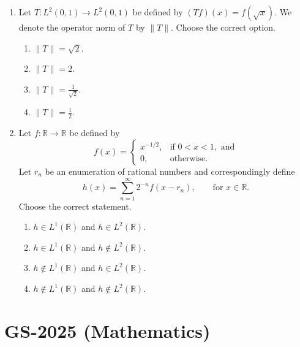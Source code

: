 \documentclass[11pt, a4paper]{article}
\begin{document}
\begin{enumerate}
  \item Let $T: L^2(0,1) \to L^2(0,1)$ be defined by $(Tf)(x) = f(\sqrt{x})$. We denote the operator norm of $T$ by $\|T\|$. Choose the correct option.
  \begin{enumerate}[label=(\alph*)]
    \item $\|T\| = \sqrt{2}$.
    \item $\|T\| = 2$.
    \item $\|T\| = \frac{1}{\sqrt{2}}$.
    \item $\|T\| = \frac{1}{2}$.
  \end{enumerate}

  \item Let $f: \mathbb{R} \to \mathbb{R}$ be defined by
  \[
    f(x) = \begin{cases}
      x^{-1/2}, & \text{if } 0 < x < 1, \text{ and} \\
      0, & \text{otherwise.}
    \end{cases}
  \]
  Let $r_n$ be an enumeration of rational numbers and correspondingly define
  \[
    h(x) = \sum_{n=1}^\infty 2^{-n} f(x - r_n), \qquad \text{for } x \in \mathbb{R}.
  \]
  Choose the correct statement.
  \begin{enumerate}[label=(\alph*)]
    \item $h \in L^1(\mathbb{R})$ and $h \in L^2(\mathbb{R})$.
    \item $h \in L^1(\mathbb{R})$ and $h \notin L^2(\mathbb{R})$.
    \item $h \notin L^1(\mathbb{R})$ and $h \in L^2(\mathbb{R})$.
    \item $h \notin L^1(\mathbb{R})$ and $h \notin L^2(\mathbb{R})$.
  \end{enumerate}
\end{enumerate}

\newpage

\section{GS-2025 (Mathematics)}
\end{document}
